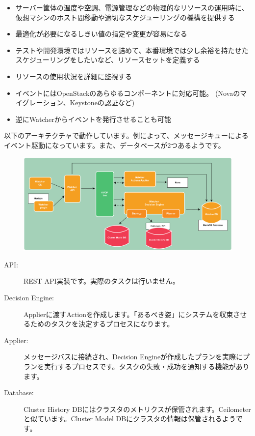 \begin{itemize}
	\item サーバー筐体の温度や空調、電源管理などの物理的なリソースの運用時に、仮想マシンのホスト間移動や適切なスケジューリングの機構を提供する
	\item 最適化が必要になるしきい値の指定や変更が容易になる
	\item テストや開発環境ではリソースを詰めて、本番環境では少し余裕を持たせたスケジューリングをしたいなど、リソースセットを定義する
	\item リソースの使用状況を詳細に監視する
	\item イベントにはOpenStackのあらゆるコンポーネントに対応可能。 (Novaのマイグレーション、Keystoneの認証など)
	\item 逆にWatcherからイベントを発行させることも可能
\end{itemize}

以下のアーキテクチャで動作しています。例によって、メッセージキューによるイベント駆動になっています。また、データベースが2つあるようです。

\begin{figure}[htb]
	\begin{center}
		\includegraphics[width=\textwidth]{img/watcher-architecture.pdf}
	\end{center}
\end{figure}

\begin{description}
	\item[API:] REST API実装です。実際のタスクは行いません。
	\item[Decision Engine:] Applierに渡すActionを作成します。「あるべき姿」にシステムを収束させるためのタスクを決定するプロセスになります。
	\item[Applier:] メッセージバスに接続され、Decision Engineが作成したプランを実際にプランを実行するプロセスです。タスクの失敗・成功を通知する機能があります。
	\item[Database:] Cluster History DBにはクラスタのメトリクスが保管されます。Ceilometerと似ています。Cluster Model DBにクラスタの情報は保管されるようです。
\end{description}

